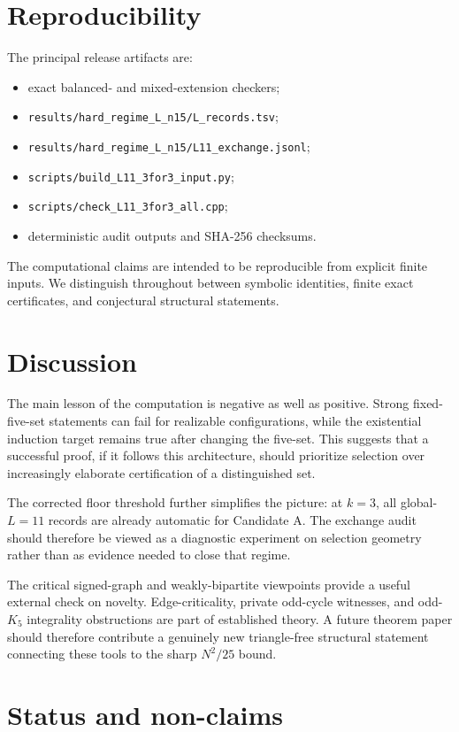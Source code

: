 \documentclass[11pt]{article}
\begin{document}
\section{Reproducibility}

The principal release artifacts are:
\begin{itemize}
\item exact balanced- and mixed-extension checkers;
\item \texttt{results/hard\_regime\_L\_n15/L\_records.tsv};
\item \texttt{results/hard\_regime\_L\_n15/L11\_exchange.jsonl};
\item \texttt{scripts/build\_L11\_3for3\_input.py};
\item \texttt{scripts/check\_L11\_3for3\_all.cpp};
\item deterministic audit outputs and SHA-256 checksums.
\end{itemize}
The computational claims are intended to be reproducible from explicit
finite inputs.  We distinguish throughout between symbolic identities,
finite exact certificates, and conjectural structural statements.

\section{Discussion}

The main lesson of the computation is negative as well as positive.
Strong fixed-five-set statements can fail for realizable configurations,
while the existential induction target remains true after changing the
five-set.  This suggests that a successful proof, if it follows this
architecture, should prioritize selection over increasingly elaborate
certification of a distinguished set.

The corrected floor threshold further simplifies the picture: at $k=3$,
all global-$L=11$ records are already automatic for Candidate A.  The
exchange audit should therefore be viewed as a diagnostic experiment on
selection geometry rather than as evidence needed to close that regime.

The critical signed-graph and weakly-bipartite viewpoints provide a useful
external check on novelty.  Edge-criticality, private odd-cycle witnesses,
and odd-$K_5$ integrality obstructions are part of established theory.  A
future theorem paper should therefore contribute a genuinely new
triangle-free structural statement connecting these tools to the sharp
$N^2/25$ bound.

\section*{Status and non-claims}
\end{document}
